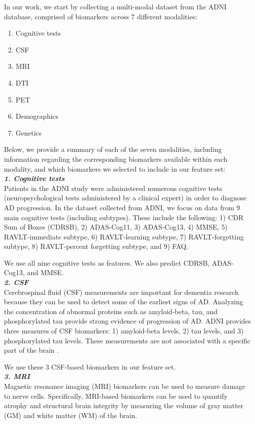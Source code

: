 \documentclass{article}
\begin{document}
In our work, we start by collecting a multi-modal dataset from the ADNI database, comprised of biomarkers across 7 different modalities:
\begin{enumerate}
  \item Cognitive tests 
  \item CSF
  \item MRI
  \item DTI
  \item PET
  \item Demographics
  \item Genetics
\end{enumerate}

Below, we provide a summary of each of the seven modalities, including information regarding the corresponding biomarkers available within each modality, and which biomarkers we selected to include in our feature set:\\


\textbf{\textit{1. Cognitive tests}}\\
Patients in the ADNI study were administered numerous cognitive tests (neuropsychological tests administered by a clinical expert) in order to diagnose AD progression. In the dataset collected from ADNI, we focus on data from 9 main cognitive tests (including subtypes). These include the following: 1) CDR Sum of Boxes (CDRSB), 2) ADAS-Cog11, 3) ADAS-Cog13, 4) MMSE, 5) RAVLT-immediate subtype, 6) RAVLT-learning subtype, 7) RAVLT-forgetting subtype, 8) RAVLT-percent forgetting subtype, and 9) FAQ. 

We use all nine cognitive tests as features. We also predict CDRSB, ADAS-Cog13, and MMSE.\\

\textbf{\textit{2. CSF}}\\
Cerebrospinal fluid (CSF) measurements are important for dementia research because they can be used to detect some of the earliest signs of AD. Analyzing the concentration of abnormal proteins such as amyloid-beta, tau, and phosphorylated tau provide strong evidence of progression of AD. ADNI provides three measures of CSF biomarkers: 1) amyloid-beta levels, 2) tau levels, and 3) phosphorylated tau levels. These measurements are not associated with a specific part of the brain \cite{tadpole2017}.

We use these 3 CSF-based biomarkers in our feature set. \\

\textbf{\textit{3. MRI}}\\
Magnetic resonance imaging (MRI) biomarkers can be used to measure damage to nerve cells. Specifically, MRI-based biomarkers can be used to quantify atrophy and structural brain integrity by measuring the volume of gray matter (GM) and white matter (WM) of the brain. \cite{tadpole2017}
\end{document}
